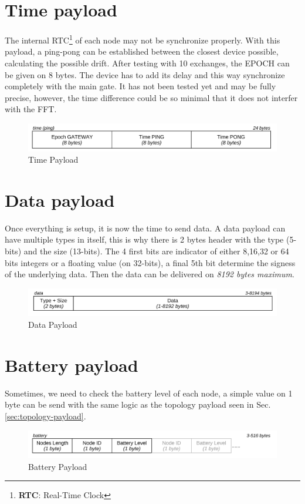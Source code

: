 \documentclass[
	a4paper,
	10pt,
	unnumberedsections,
	twoside,
]{LTJournalArticle}
\begin{document}
\section{Time payload}\label{sec:time-payload}
The internal RTC\footnote{\textbf{RTC}: Real-Time Clock} of each node may not be synchronize properly. With this payload, a ping-pong can be established between the closest device possible, calculating the possible drift. After testing with 10 exchanges, the EPOCH can be given on 8 bytes. The device has to add its delay and this way synchronize completely with the main gate. It has not been tested yet and may be fully precise, however, the time difference could be so minimal that it does not interfer with the FFT.
\begin{figure}[H]
    \centering
    \includegraphics[width=1\linewidth]{img/time.png}
    \caption{Time Payload}
    \label{fig:time}
\end{figure}

\section{Data payload} \label{sec:data-payload}
Once everything is setup, it is now the time to send data. A data payload can have multiple types in itself, this is why there is 2 bytes header with the type (5-bits) and the size (13-bits). The 4 first bits are indicator of either 8,16,32 or 64 bits integers or a floating value (on 32-bits), a final 5th bit determine the signess of the underlying data. Then the data can be delivered on \textit{8192 bytes maximum}.
\begin{figure}[H]
    \centering
    \includegraphics[width=1\linewidth]{img/data.png}
    \caption{Data Payload}
    \label{fig:data}
\end{figure}

\section{Battery payload} \label{sec:battery-payload}
Sometimes, we need to check the battery level of each node, a simple value on 1 byte can be send with the same logic as the topology payload seen in Sec.\ref{sec:topology-payload}.
\begin{figure}[H]
    \centering
    \includegraphics[width=1\linewidth]{img/battery.png}
    \caption{Battery Payload}
    \label{fig:battery}
\end{figure}
\end{document}
